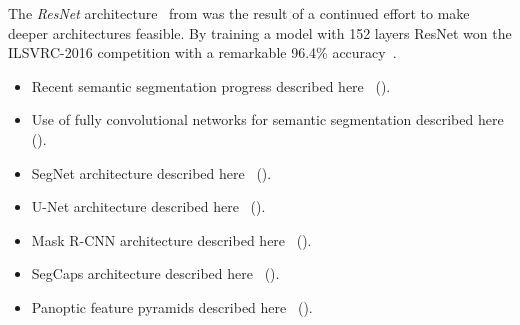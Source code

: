 The \textit{ResNet} architecture~\cite{resnet} from \citeyear{resnet} was the result of a continued effort to make deeper architectures feasible.
By training a model with 152 layers ResNet won the ILSVRC-2016 competition with a remarkable 96.4\% accuracy~\cite{segmentation-overview}.

\begin{itemize}
  \item Recent semantic segmentation progress described here~\cite{segmentation-progress} (\citeyear{segmentation-progress}).
  \item Use of fully convolutional networks for semantic segmentation described here~\cite{segmentation-fcnn} (\citeyear{segmentation-fcnn}).
  \item SegNet architecture described here~\cite{segmentation-segnet} (\citeyear{segmentation-segnet}).
  \item U-Net architecture described here~\cite{segmentation-unet} (\citeyear{segmentation-unet}).
  \item Mask R-CNN architecture described here~\cite{segmentation-mask-r-cnn} (\citeyear{segmentation-mask-r-cnn}).
  \item SegCaps architecture described here~\cite{segmentation-segcaps} (\citeyear{segmentation-segcaps}).
  \item Panoptic feature pyramids described here~\cite{segmentation-panoptic-feature-pyramid} (\citeyear{segmentation-panoptic-feature-pyramid}).
\end{itemize}
